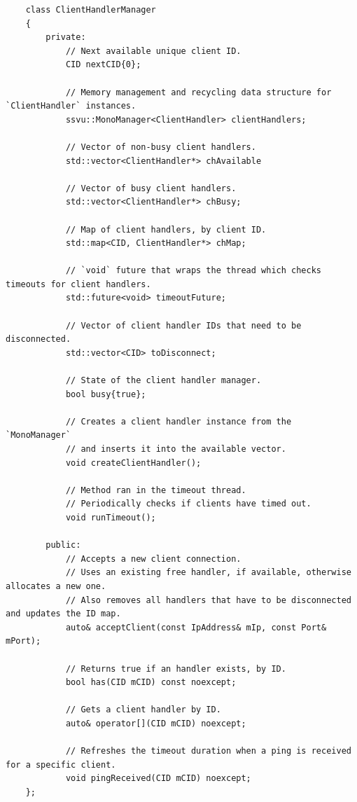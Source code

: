 \documentclass{report}
\begin{document}
\begin{verbatim}
    class ClientHandlerManager
    {
        private:
            // Next available unique client ID. 
            CID nextCID{0};

            // Memory management and recycling data structure for `ClientHandler` instances.
            ssvu::MonoManager<ClientHandler> clientHandlers;

            // Vector of non-busy client handlers.
            std::vector<ClientHandler*> chAvailable
            
            // Vector of busy client handlers.
            std::vector<ClientHandler*> chBusy;
            
            // Map of client handlers, by client ID.
            std::map<CID, ClientHandler*> chMap;

            // `void` future that wraps the thread which checks timeouts for client handlers.
            std::future<void> timeoutFuture;

            // Vector of client handler IDs that need to be disconnected.
            std::vector<CID> toDisconnect;

            // State of the client handler manager.
            bool busy{true};

            // Creates a client handler instance from the `MonoManager`
            // and inserts it into the available vector.
            void createClientHandler();
            
            // Method ran in the timeout thread.
            // Periodically checks if clients have timed out.
            void runTimeout();

        public: 
            // Accepts a new client connection.
            // Uses an existing free handler, if available, otherwise allocates a new one.
            // Also removes all handlers that have to be disconnected and updates the ID map.
            auto& acceptClient(const IpAddress& mIp, const Port& mPort);

            // Returns true if an handler exists, by ID.
            bool has(CID mCID) const noexcept;

            // Gets a client handler by ID.
            auto& operator[](CID mCID) noexcept;

            // Refreshes the timeout duration when a ping is received for a specific client.
            void pingReceived(CID mCID) noexcept;
    };
\end{verbatim}
            
\end{document}
